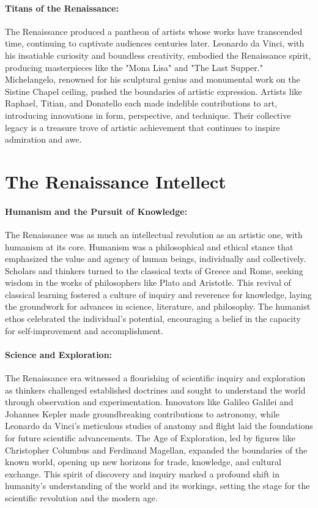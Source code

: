 \documentclass[a4paper,12pt]{book}
\begin{document}
\paragraph{Titans of the Renaissance:}
The Renaissance produced a pantheon of artists whose works have transcended time, continuing to captivate audiences centuries later. Leonardo da Vinci, with his insatiable curiosity and boundless creativity, embodied the Renaissance spirit, producing masterpieces like the "Mona Lisa" and "The Last Supper." Michelangelo, renowned for his sculptural genius and monumental work on the Sistine Chapel ceiling, pushed the boundaries of artistic expression. Artists like Raphael, Titian, and Donatello each made indelible contributions to art, introducing innovations in form, perspective, and technique. Their collective legacy is a treasure trove of artistic achievement that continues to inspire admiration and awe.

\section*{The Renaissance Intellect}

\paragraph{Humanism and the Pursuit of Knowledge:}
The Renaissance was as much an intellectual revolution as an artistic one, with humanism at its core. Humanism was a philosophical and ethical stance that emphasized the value and agency of human beings, individually and collectively. Scholars and thinkers turned to the classical texts of Greece and Rome, seeking wisdom in the works of philosophers like Plato and Aristotle. This revival of classical learning fostered a culture of inquiry and reverence for knowledge, laying the groundwork for advances in science, literature, and philosophy. The humanist ethos celebrated the individual's potential, encouraging a belief in the capacity for self-improvement and accomplishment.

\paragraph{Science and Exploration:}
The Renaissance era witnessed a flourishing of scientific inquiry and exploration as thinkers challenged established doctrines and sought to understand the world through observation and experimentation. Innovators like Galileo Galilei and Johannes Kepler made groundbreaking contributions to astronomy, while Leonardo da Vinci's meticulous studies of anatomy and flight laid the foundations for future scientific advancements. The Age of Exploration, led by figures like Christopher Columbus and Ferdinand Magellan, expanded the boundaries of the known world, opening up new horizons for trade, knowledge, and cultural exchange. This spirit of discovery and inquiry marked a profound shift in humanity’s understanding of the world and its workings, setting the stage for the scientific revolution and the modern age.
\end{document}
